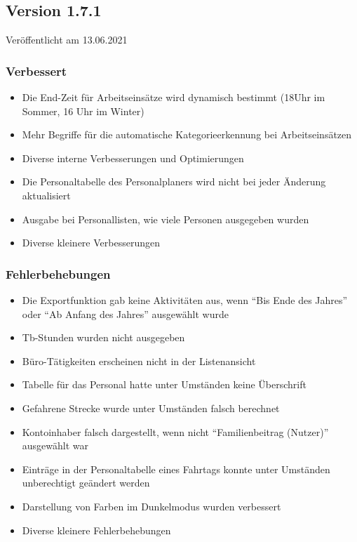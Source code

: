 \subsection{Version 1.7.1}
\label{version:1:7:1}
Veröffentlicht am 13.06.2021
\subsubsection{Verbessert}
\begin{itemize}
  \item
  Die End-Zeit für Arbeitseinsätze wird dynamisch bestimmt (18Uhr im Sommer, 16 Uhr im Winter)
  \item
  Mehr Begriffe für die automatische Kategorieerkennung bei Arbeitseinsätzen
  \item
  Diverse interne Verbesserungen und Optimierungen
  \item
  Die Personaltabelle des Personalplaners wird nicht bei jeder Änderung aktualisiert
  \item
  Ausgabe bei Personallisten, wie viele Personen ausgegeben wurden
  \item
  Diverse kleinere Verbesserungen
\end{itemize}

\subsubsection{Fehlerbehebungen}
\begin{itemize}
  \item
  Die Exportfunktion gab keine Aktivitäten aus, wenn "`Bis Ende des Jahres"' oder "`Ab Anfang des Jahres"' ausgewählt wurde
  \item
  Tb-Stunden wurden nicht ausgegeben
  \item
  Büro-Tätigkeiten erscheinen nicht in der Listenansicht
  \item
  Tabelle für das Personal hatte unter Umständen keine Überschrift
  \item
  Gefahrene Strecke wurde unter Umständen falsch berechnet
  \item
  Kontoinhaber falsch dargestellt, wenn nicht "`Familienbeitrag (Nutzer)"' ausgewählt war
  \item
  Einträge in der Personaltabelle eines Fahrtags konnte unter Umständen unberechtigt geändert werden
  \item
  Darstellung von Farben im Dunkelmodus wurden verbessert
  \item
  Diverse kleinere Fehlerbehebungen
\end{itemize}
